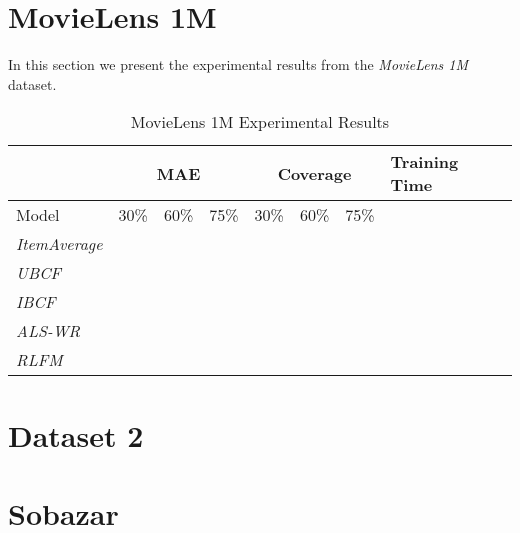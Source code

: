 




\section{MovieLens 1M}

In this section we present the experimental results from the \emph{MovieLens 1M} dataset.

\begin{table}
\centering
\begin{tabular}{|l|l|l|l|l|l|l|l|}
\hline
	 					&	\multicolumn{3}{c|}{MAE} 				&	\multicolumn{3}{c|}{Coverage} 				& Training Time		\\ \hline
Model 					& 	30\%		& 	60\%	 & 	75\%		& 	30\%		& 	60\%	 		& 	75\%	&					\\ \hline	
\emph{ItemAverage}		&				&			 &				&				&					&			&					\\ \hline
\emph{UBCF}				&				&			 &				&				&			 		&			&					\\ \hline
\emph{IBCF}				&				&			 &				&				&					&			&					\\ \hline
\emph{ALS-WR}			&				&			 &				&				&					&			&					\\ \hline
\emph{RLFM}				&				&			 &				&				&					&			&					\\ \hline
\end{tabular}
\caption{MovieLens 1M Experimental Results}
\end{table}



\section{Dataset 2}


\section{Sobazar}




